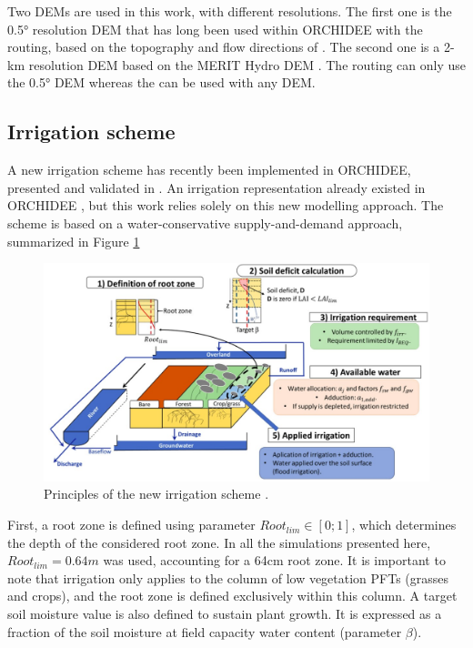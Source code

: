 Two DEMs are used in this work, with different resolutions. 
The first one is the 0.5° resolution DEM that has long been used within ORCHIDEE with the \std routing, based on the topography and flow directions of \citet{vorosmarty_geomorphometric_2000}.
The second one is a 2-km resolution DEM based on the MERIT Hydro DEM \citep{yamazaki_merit_2019}.
The \std routing can only use the 0.5° DEM whereas the \native can be used with any DEM.


\subsection{Irrigation scheme}

A new irrigation scheme has recently been implemented in ORCHIDEE, presented and validated in \citet{arboleda-obando_validation_2024}. An irrigation representation already existed in ORCHIDEE \citep{de_rosnay_integrated_2003, guimberteau_global_2012}, but this work relies solely on this new modelling approach. The scheme is based on a water-conservative supply-and-demand approach, summarized in Figure \ref{fig:schema_pedro}

\begin{figure}[t]
    \centering
    \includegraphics[width=1\textwidth]{images/methods/schema_pedro.png}
    \caption{Principles of the new irrigation scheme \citep[from][]{arboleda-obando_validation_2024}.}
    \label{fig:schema_pedro}
\end{figure}

First, a root zone is defined using parameter $Root_{lim} \in [0;1]$, which determines the depth of the considered root zone. In all the simulations presented here, $Root_{lim} = 0.64m$ was used, accounting for a 64cm root zone. It is important to note that irrigation only applies to the column of low vegetation PFTs (grasses and crops), and the root zone is defined exclusively within this column.%
A target soil moisture value is also defined to sustain plant growth. It is expressed as a fraction of the soil moisture at field capacity water content (parameter $\beta$).

